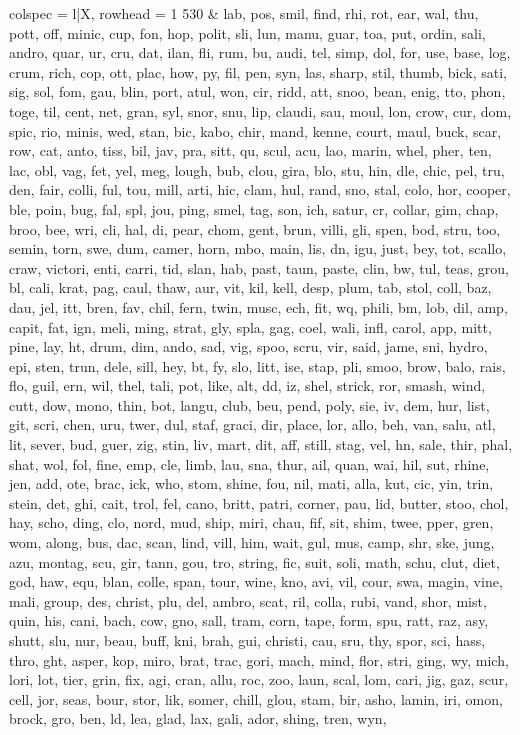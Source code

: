 \begin{tblr}[
  long,
  caption = {Examples from SNLI.},
  entry = {Short Caption},
  label = {tblr:test},
]{
colspec = {l|X},
rowhead = 1}
530 & lab, pos, smil, find, rhi, rot, ear, wal, thu, pott, off, minic, cup, fon, hop, polit, sli, lun, manu, guar, toa, put, ordin, sali, andro, quar, ur, cru, dat, ilan, fli, rum, bu, audi, tel, simp, dol, for, use, base, log, crum, rich, cop, ott, plac, how, py, fil, pen, syn, las, sharp, stil, thumb, bick, sati, sig, sol, fom, gau, blin, port, atul, won, cir, ridd, att, snoo, bean, enig, tto, phon, toge, til, cent, net, gran, syl, snor, snu, lip, claudi, sau, moul, lon, crow, cur, dom, spic, rio, minis, wed, stan, bic, kabo, chir, mand, kenne, court, maul, buck, scar, row, cat, anto, tiss, bil, jav, pra, sitt, qu, scul, acu, lao, marin, whel, pher, ten, lac, obl, vag, fet, yel, meg, lough, bub, clou, gira, blo, stu, hin, dle, chic, pel, tru, den, fair, colli, ful, tou, mill, arti, hic, clam, hul, rand, sno, stal, colo, hor, cooper, ble, poin, bug, fal, spl, jou, ping, smel, tag, son, ich, satur, cr, collar, gim, chap, broo, bee, wri, cli, hal, di, pear, chom, gent, brun, villi, gli, spen, bod, stru, too, semin, torn, swe, dum, camer, horn, mbo, main, lis, dn, igu, just, bey, tot, scallo, craw, victori, enti, carri, tid, slan, hab, past, taun, paste, clin, bw, tul, teas, grou, bl, cali, krat, pag, caul, thaw, aur, vit, kil, kell, desp, plum, tab, stol, coll, baz, dau, jel, itt, bren, fav, chil, fern, twin, musc, ech, fit, wq, phili, bm, lob, dil, amp, capit, fat, ign, meli, ming, strat, gly, spla, gag, coel, wali, infl, carol, app, mitt, pine, lay, ht, drum, dim, ando, sad, vig, spoo, scru, vir, said, jame, sni, hydro, epi, sten, trun, dele, sill, hey, bt, fy, slo, litt, ise, stap, pli, smoo, brow, balo, rais, flo, guil, ern, wil, thel, tali, pot, like, alt, dd, iz, shel, strick, ror, smash, wind, cutt, dow, mono, thin, bot, langu, club, beu, pend, poly, sie, iv, dem, hur, list, git, scri, chen, uru, twer, dul, staf, graci, dir, place, lor, allo, beh, van, salu, atl, lit, sever, bud, guer, zig, stin, liv, mart, dit, aff, still, stag, vel, hn, sale, thir, phal, shat, wol, fol, fine, emp, cle, limb, lau, sna, thur, ail, quan, wai, hil, sut, rhine, jen, add, ote, brac, ick, who, stom, shine, fou, nil, mati, alla, kut, cic, yin, trin, stein, det, ghi, cait, trol, fel, cano, britt, patri, corner, pau, lid, butter, stoo, chol, hay, scho, ding, clo, nord, mud, ship, miri, chau, fif, sit, shim, twee, pper, gren, wom, along, bus, dac, scan, lind, vill, him, wait, gul, mus, camp, shr, ske, jung, azu, montag, scu, gir, tann, gou, tro, string, fic, suit, soli, math, schu, clut, diet, god, haw, equ, blan, colle, span, tour, wine, kno, avi, vil, cour, swa, magin, vine, mali, group, des, christ, plu, del, ambro, scat, ril, colla, rubi, vand, shor, mist, quin, his, cani, bach, cow, gno, sall, tram, corn, tape, form, spu, ratt, raz, asy, shutt, slu, nur, beau, buff, kni, brah, gui, christi, cau, sru, thy, spor, sci, hass, thro, ght, asper, kop, miro, brat, trac, gori, mach, mind, flor, stri, ging, wy, mich, lori, lot, tier, grin, fix, agi, cran, allu, roc, zoo, laun, scal, lom, cari, jig, gaz, scur, cell, jor, seas, bour, stor, lik, somer, chill, glou, stam, bir, asho, lamin, iri, omon, brock, gro, ben, ld, lea, glad, lax, gali, ador, shing, tren, wyn, 
\end{tblr}

